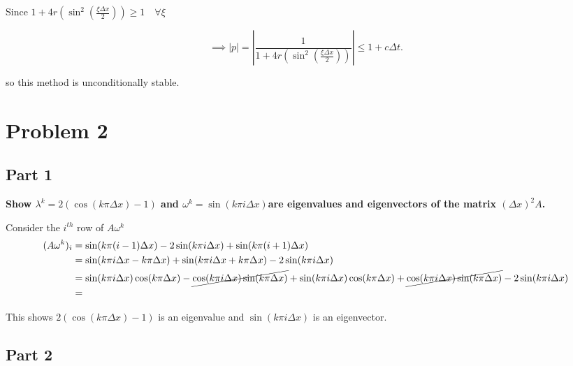 \documentclass[12pt,a4paper]{article}
\begin{document}
Since $1 + 4r \left( \sin^2(
\frac{\xi\Delta x}{2})\right) \geq 1 \quad \forall\xi$

\[
\implies |p| = \left|\frac{1}{1 + 4r \left( \sin^2( \frac{\xi\Delta
x}{2})\right) } \right| \leq 1 + c\Delta t
.\] 

\vspace{15px}
\par so this method is unconditionally stable.

\section{Problem 2}%
\label{sec:problem_2}

\subsection{Part 1}%
\label{sub:part_1}

\textbf{Show $\lambda^{k} = 2(\cos(k\pi \Delta x) - 1)$ and $\omega^{k}
= \sin(k\pi i \Delta x) $are eigenvalues and eigenvectors of the matrix $(
\Delta x)^{2}A$.} 
\vspace{15px}

\par Consider the $i^{th}$ row of $A \omega^{k}$
\begin{align*}
  (A \omega^{k})_{i} &= \sin(k\pi(i-1)\Delta x) - 2\sin(k\pi i\Delta x)
  + \sin(k\pi (i+1)\Delta x) \\ 
                     &= \sin(k\pi i \Delta x - k\pi \Delta x) + \sin(k\pi
                     i \Delta x + k\pi\Delta x) - 2\sin(k\pi i \Delta x) \\
                     &= \sin(k\pi i \Delta x)\cos(k\pi \Delta x)
                     - \cancel{\cos(k\pi i \Delta x)\sin(k\pi \Delta x)}
                     + \sin(k\pi i \Delta x)\cos(k\pi \Delta x)
                     +\cancel{\cos(k\pi i \Delta x)\sin(k\pi \Delta x)}
                     - 2\sin(k\pi i \Delta x)\\
                     &=  \\
\end{align*}

This shows $2(\cos(k\pi \Delta x) - 1)$ is an eigenvalue and $\sin(k\pi
i \Delta x)$ is an eigenvector.


\subsection{Part 2}%
\label{sub:part_2}
\end{document}
